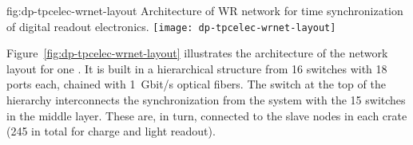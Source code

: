 \begin{dunefigure}{fig:dp-tpcelec-wrnet-layout}
{Architecture of WR network for time synchronization of digital readout electronics.}
\texttt{[image: dp-tpcelec-wrnet-layout]}
\end{dunefigure}

Figure~\ref{fig:dp-tpcelec-wrnet-layout} illustrates the architecture of the  network layout for one . It is built in a hierarchical structure from \num{16}  switches with \num{18} ports each, chained with \SI{1}{Gbit/s} optical fibers. The switch at the top of the hierarchy interconnects the synchronization  from the  system with the \num{15} switches in the middle layer. These are, in turn, connected to the  slave nodes in each  crate (\num{245} in total for charge and light readout). 


